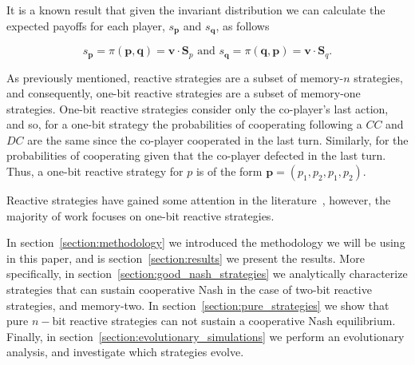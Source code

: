 \documentclass{article}
\theoremstyle{definition}
\begin{document}
It is a known result that given the invariant distribution we can calculate the expected payoffs for
each player, \(s_{\mathbf{p}}\) and \(s_{\mathbf{q}}\), as follows

\begin{equation*}
  s_{\mathbf{p}} = \pi(\mathbf{p}, \mathbf{q}) = \mathbf{v} \cdot \mathbf{S}_{p} \text{ and } s_{\mathbf{q}} = \pi(\mathbf{q}, \mathbf{p}) = \mathbf{v} \cdot \mathbf{S}_{q}.
\end{equation*}

As previously mentioned, reactive strategies are a subset of memory-\(n\)
strategies, and consequently, one-bit reactive strategies are a subset of
memory-one strategies. One-bit reactive strategies consider only the co-player's
last action, and so, for a one-bit strategy the probabilities of cooperating
following a \(CC\) and \(DC\) are the same since the co-player cooperated in the
last turn. Similarly, for the probabilities of cooperating given that the
co-player defected in the last turn. Thus, a one-bit reactive strategy for \(p\)
is of the form \(\mathbf{p} = (p_1, p_2, p_1, p_2)\).

Reactive strategies have gained some attention in the
literature~\citep{sigmund:JTB:1989, wahl:JTB:1999}, however, the majority of
work focuses on one-bit reactive strategies.


In section~\ref{section:methodology} we introduced the methodology we will be
using in this paper, and is section~\ref{section:results} we present the
results. More specifically, in section~\ref{section:good_nash_strategies} we
analytically characterize strategies that can sustain cooperative Nash in the
case of two-bit reactive strategies, and memory-two. In
section~\ref{section:pure_strategies} we show that pure \(n-\)bit reactive
strategies can not sustain a cooperative Nash equilibrium. Finally, in
section~\ref{section:evolutionary_simulations} we perform an evolutionary
analysis, and investigate which strategies evolve.
\end{document}
